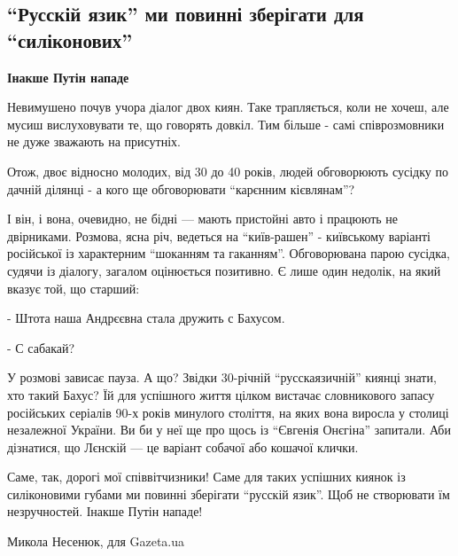  
 
 
 
 

\subsection{\enquote{Русскій язик} ми повинні зберігати для \enquote{силіконових}}
\label{sec:20_11_2020.news.ua.gazeta.1.russki_jazyk_silikonovy}


\begin{leftbar}
	\bfseries
	Інакше Путін нападе
\end{leftbar}

Невимушено почув учора діалог двох киян. Таке трапляється, коли не хочеш, але
мусиш вислуховувати те, що говорять довкіл. Тим більше - самі співрозмовники не
дуже зважають на присутніх.

Отож, двоє відносно молодих, від 30 до 40 років, людей обговорюють сусідку по
дачній ділянці - а кого ще обговорювати \enquote{карєнним кієвлянам}?

І він, і вона, очевидно, не бідні --- мають пристойні авто і працюють не
двірниками. Розмова, ясна річ, ведеться на \enquote{київ-рашен} - київському варіанті
російської із характерним \enquote{шоканням та гаканням}. Обговорювана парою сусідка,
судячи із діалогу, загалом оцінюється позитивно. Є лише один недолік, на який
вказує той, що старший:

- Штота наша Андрєєвна стала дружить с Бахусом.

- С сабакай?

У розмові зависає пауза. А що? Звідки 30-річній \enquote{русскаязичній} киянці знати,
хто такий Бахус? Їй для успішного життя цілком вистачає словникового запасу
російських серіалів 90-х років минулого століття, на яких вона виросла у
столиці незалежної України. Ви би у неї ще про щось із \enquote{Євгенія Онєгіна}
запитали. Аби дізнатися, що Лєнскій --- це варіант собачої або кошачої клички.

Саме, так, дорогі мої співвітчизники! Саме для таких успішних киянок із
силіконовими губами ми повинні зберігати \enquote{русскій язик}. Щоб не створювати їм
незручностей. Інакше Путін нападе!

Микола Несенюк, для Gazeta.ua

